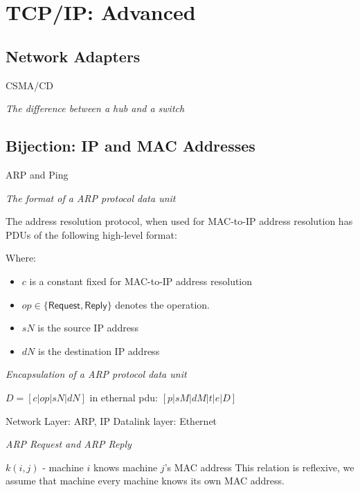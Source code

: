 \chapter{TCP/IP: Advanced}


\section{Network Adapters}


CSMA/CD




\frmrule

\textit{The difference between a hub and a switch}




\section{Bijection: IP and MAC Addresses}

ARP and Ping

\frmrule 

\textit{The format of a ARP protocol data unit}

The address resolution protocol, when used for 
MAC-to-IP address resolution has PDUs of the following high-level format: 

Where:
\begin{itemize}[nosep]
\item $c$ is a constant fixed for MAC-to-IP address resolution
\item $op \in \{\textsf{Request}, \textsf{Reply} \}$ denotes 
the operation.
\item $sN$ is the source IP address 
\item $dN$ is the destination IP address
\end{itemize}

\frmrule 

\textit{Encapsulation of a ARP protocol data unit}


$D = [c | op | sN | dN]$ in ethernal pdu: $[p|sM|dM|t|e|D]$


Network Layer: ARP, IP
Datalink layer: Ethernet 

\frmrule 

\textit{ARP Request and ARP Reply}



$k(i,j)$ - machine $i$ knows machine $j$'s MAC address
This relation is reflexive, we assume that machine every machine knows its own MAC address.

